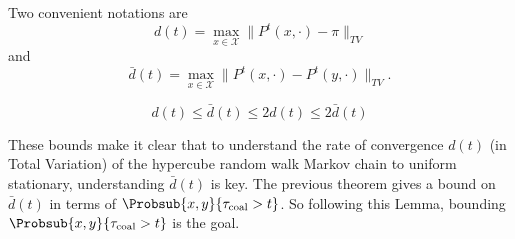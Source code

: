 \documentclass[12pt]{article}
\begin{document}
Two convenient notations are
\[
    d(t) = \max_{x \in \mathcal{X}} \| P^t(x, \cdot) - \pi \|_{TV}
\] and
\[
    \bar{d}(t) = \max_{x \in \mathcal{X}} \| P^t(x, \cdot) - P^t(y,\cdot)\|_
    {TV}.
\]

\begin{lemma}
    \[
        d(t) \le \bar{d}(t) \le 2 d(t) \le 2 \bar{d}(t)
    \]
\end{lemma}

\begin{remark}
    These bounds make it clear that to understand the rate of
    convergence \( d(t) \) (in Total Variation) of the hypercube random
    walk Markov chain to uniform stationary, understanding \( \bar{d}(t)
    \) is key.  The previous theorem gives a bound on \( \bar{d}(t) \)
    in terms of \( \Probsub{x,y}{\tau_{\text{coal}} > t} \).  So
    following this Lemma, bounding \( \Probsub{x,y}{\tau_{\text{coal}} >
    t} \) is the goal.
\end{remark}
\end{document}
